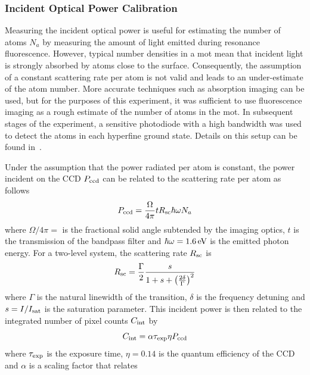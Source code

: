 \subsubsection{Incident Optical Power Calibration} 
Measuring the incident optical power is useful for estimating the
number of atoms \(N_a\) by measuring the amount of light emitted
during resonance fluorescence. However, typical number densities in a
\ac{mot} mean that incident light is strongly absorbed by atoms close
to the surface. Consequently, the
assumption of a constant scattering rate per atom is not valid and leads to an
under-estimate of the atom number. More accurate techniques such as
absorption imaging can be used, but for the purposes of this
experiment, it was
sufficient to use fluorescence imaging as a rough estimate of the
number of atoms in the \ac{mot}. In subsequent stages of the
experiment, a sensitive photodiode with a high bandwidth was used to
detect the atoms in each hyperfine ground state. Details on this setup
can
be found in~. \par\noindent
Under the assumption that the
power radiated per atom is constant, the power incident on the CCD
\(P_\textnormal{ccd}\) can be related to the scattering rate per atom as follows
\begin{equation}
	P_\textnormal{ccd} = \frac{\Omega}{4\pi} t R_\textnormal{sc}  \hbar \omega N_a
\end{equation}
where $\Omega/4\pi = $ is the fractional solid angle subtended by
the imaging optics, \(t\) is the transmission of the bandpass filter
and 
\(\hbar \omega =
\sivalue{1.6}{\electronvolt}\) is the emitted photon energy. For a
two-level system, the scattering rate $R_\textnormal{sc}$ is 
\begin{equation}
  \label{eq:scattering_rate}
  R_\textnormal{sc} = \frac{\Gamma}{2} \frac{s}{1+s+\left(\frac{2
  \delta}{\Gamma}\right)^2}
\end{equation}
where $\Gamma$ is the natural linewidth of the transition, $\delta$ is
the frequency detuning and $s = I/I_\textnormal{sat}$ is the
saturation parameter. This incident power
is then related to the integrated number of pixel counts \(C_\textnormal{int}\)
by
\begin{equation}
	C_\textnormal{int} = \alpha \tau_\textnormal{exp} \eta P_\textnormal{ccd}
\end{equation}
where \(\tau_\textnormal{exp}\) is the exposure time, \(\eta = 0.14\) is the
quantum efficiency of the CCD and \(\alpha\) is a scaling factor that relates
